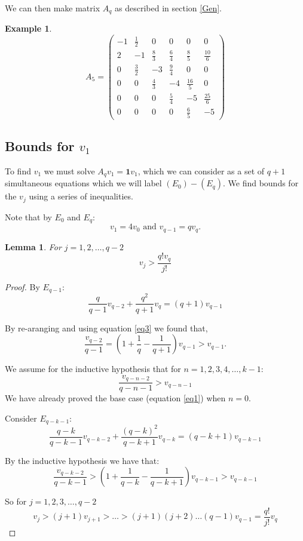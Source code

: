 \documentclass[12pt]{article} %
\newtheorem{lem}[thm]{Lemma}
\theoremstyle{definition}
\newtheorem{ex}[thm]{Example}
\begin{document}
We can then make matrix $A_{q}$ as described in section \ref{Gen}. 

\begin{ex}
 \begin{equation}
  A_{5} = \left(
  \begin{matrix}
  -1 & \frac{1}{2} & 0 & 0 & 0 & 0 \\
  2 & -1 & \frac{8}{3} & \frac{6}{4} & \frac{8}{5} & \frac{10}{6} \\
  0 & \frac{3}{2} & -3 &\frac{9}{4} & 0 & 0 \\
  0 & 0 & \frac{4}{3} & -4 & \frac{16}{5} & 0 \\
  0 & 0 & 0 & \frac{5}{4} & -5 & \frac{25}{6} \\
  0 & 0 & 0 & 0 & \frac{6}{5} & -5 
  
 \end{matrix}
 \right)
\end{equation}
\end{ex}




\subsection{Bounds for $v_{1}$}\label{sec:bounds}
To find $v_{1}$ we must solve $A_{q}v_{1} = \bm{1}v_{1}$, which we can consider as a set of $q+1$ simultaneous equations which we will label $(E_{0}) - (E_{q})$.   
We find bounds for the $v_{j}$ using a series of inequalities.

Note that by $E_{0}$ and $E_{q}$:
\begin{equation}\label{eq3}
 v_{1} = 4v_{0} \text{    and    } v_{q-1} = qv_{q}.
\end{equation}

\begin{lem}\label{lem:bounds1}
 For $j = 1,2,\dots,q-2$ 
 \[v_{j} > \frac{q!v_{q}}{j!}\]
\end{lem}
\begin{proof}
By $E_{q-1}$: 
\[
 \frac{q}{q-1} v_{q-2} + \frac{q^{2}}{q+1}v_{q} = (q+1)v_{q-1} 
\]

By re-aranging and using equation \ref{eq3} we found that,
\begin{equation}\label{eq1}
\frac{v_{q-2}}{q-1}  = (1 + \frac{1}{q} - \frac{1}{q+1})v_{q-1} > v_{q-1}.
\end{equation}

We assume for the inductive hypothesis that for $n=1,2,3,4,\dots,k-1$:
\[\frac{v_{q-n-2}}{q-n-1} > v_{q-n-1}\]
We have already proved the base case (equation \ref{eq1}) when $n=0$.

Consider $E_{q - k - 1}$:
\[\frac{q - k}{q-k -1} v_{q-k-2} + \frac{(q-k)^{2}}{q-k+1}v_{q-k} = (q-k+1)v_{q-k-1}  \] 

By the inductive hypothesis we have that:
\[\frac{v_{q-k-2}}{q-k-1} > (1 + \frac{1}{q-k} - \frac{1}{q-k+1})v_{q-k-1} > v_{q-k-1}\]

So for $j = 1,2,3,\dots, q-2$ 
\begin{equation}\label{eq2}
v_{j} > (j+1)v_{j+1} > \dots > (j+1)(j+2)\dots (q-1)v_{q-1} = \frac{q!}{j!}v_{q}
\end{equation}
\end{proof}
\end{document}
